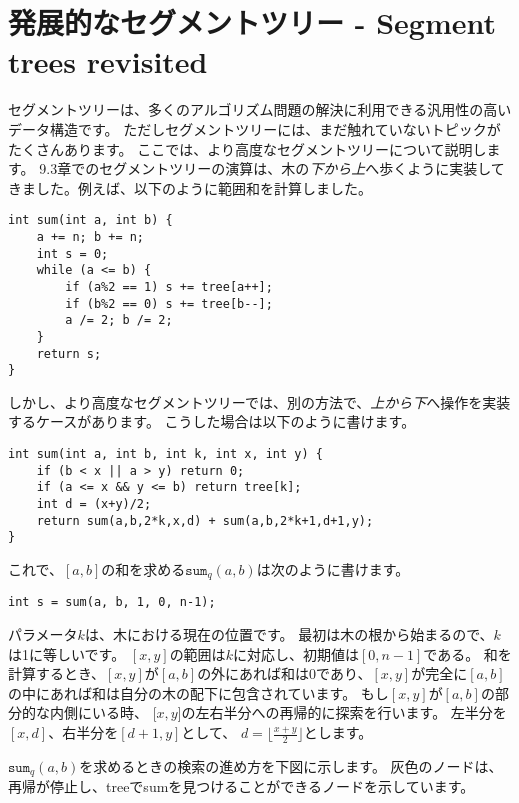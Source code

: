 \chapter{発展的なセグメントツリー - Segment trees revisited}


セグメントツリーは、多くのアルゴリズム問題の解決に利用できる汎用性の高いデータ構造です。
ただしセグメントツリーには、まだ触れていないトピックがたくさんあります。
ここでは、より高度なセグメントツリーについて説明します。
9.3章でのセグメントツリーの演算は、木の\emph{下から上}へ歩くように実装してきました。例えば、以下のように範囲和を計算しました。

\begin{lstlisting}
int sum(int a, int b) {
    a += n; b += n;
    int s = 0;
    while (a <= b) {
        if (a%2 == 1) s += tree[a++];
        if (b%2 == 0) s += tree[b--];
        a /= 2; b /= 2;
    }
    return s;
}
\end{lstlisting}

しかし、より高度なセグメントツリーでは、別の方法で、\emph{上から下}へ操作を実装するケースがあります。
こうした場合は以下のように書けます。
\begin{lstlisting}
int sum(int a, int b, int k, int x, int y) {
    if (b < x || a > y) return 0;
    if (a <= x && y <= b) return tree[k];
    int d = (x+y)/2;
    return sum(a,b,2*k,x,d) + sum(a,b,2*k+1,d+1,y);
}
\end{lstlisting}

これで、$[a,b]$の和を求める$\texttt{sum}_q(a,b)$は次のように書けます。
\begin{lstlisting}
int s = sum(a, b, 1, 0, n-1);
\end{lstlisting}

パラメータ$k$は、木における現在の位置です。
最初は木の根から始まるので、$k$は1に等しいです。
$[x,y]$の範囲は$k$に対応し、初期値は$[0, n - 1]$である。
和を計算するとき、$[x, y]$が$[a, b]$の外にあれば和は0であり、$[x, y]$が完全に$[a, b]$の中にあれば和は自分の木の配下に包含されています。
もし$[x, y]$が$[a, b]$の部分的な内側にいる時、
$[x, y$]の左右半分への再帰的に探索を行います。
左半分を$[x, d]$、右半分を$[d + 1, y]$として、
$d=\lfloor \frac{x+y}{2} \rfloor$とします。

$\texttt{sum}_q(a,b)$を求めるときの検索の進め方を下図に示します。
灰色のノードは、再帰が停止し、treeでsumを見つけることができるノードを示しています。

